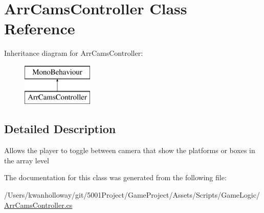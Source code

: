 \hypertarget{class_arr_cams_controller}{}\section{Arr\+Cams\+Controller Class Reference}
\label{class_arr_cams_controller}
Inheritance diagram for Arr\+Cams\+Controller\+:\begin{figure}[H]
\begin{center}
\leavevmode
\includegraphics[height=2.000000cm]{class_arr_cams_controller}
\end{center}
\end{figure}


\subsection{Detailed Description}
Allows the player to toggle between camera that show the platforms or boxes in the array level 

The documentation for this class was generated from the following file\+:\begin{DoxyCompactItemize}
\item 
/\+Users/kwanholloway/git/5001\+Project/\+Game\+Project/\+Assets/\+Scripts/\+Game\+Logic/\hyperlink{_arr_cams_controller_8cs}{Arr\+Cams\+Controller.\+cs}\end{DoxyCompactItemize}
